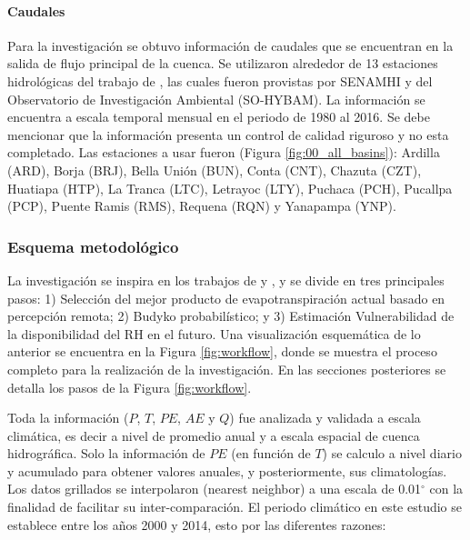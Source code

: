 \documentclass[12pt]{article}
\begin{document}
\paragraph{Caudales}\mbox{}

Para la investigación se obtuvo información de caudales que se encuentran en la salida de flujo principal de la cuenca. Se utilizaron alrededor de 13 estaciones hidrológicas del trabajo de \citet{Aybar2019}, las cuales fueron provistas por SENAMHI y del Observatorio de Investigación Ambiental (SO-HYBAM). La información se encuentra a escala temporal mensual en el periodo de 1980 al 2016. Se debe mencionar que la información presenta un control de calidad riguroso y no esta completado. Las estaciones a usar fueron (Figura \ref{fig:00_all_basins}): Ardilla (ARD), Borja (BRJ), Bella Unión (BUN), Conta (CNT), Chazuta (CZT), Huatiapa (HTP), La Tranca (LTC), Letrayoc (LTY), Puchaca (PCH), Pucallpa (PCP), Puente Ramis (RMS), Requena (RQN) y Yanapampa (YNP).

\clearpage

\clearpage

\clearpage

\subsubsection{Esquema metodológico}

La investigación se inspira en los trabajos de \citet{Singh2015} y \citet{Weerasinghe2019discuss}, y se divide en tres principales pasos: 1) Selección del mejor producto de evapotranspiración actual basado en percepción remota; 2) Budyko probabilístico; y 3) Estimación Vulnerabilidad de la disponibilidad del RH en el futuro. Una visualización esquemática de lo anterior se encuentra en la Figura \ref{fig:workflow}, donde se muestra el proceso completo para la realización de la investigación. En las secciones posteriores se detalla los pasos de la Figura \ref{fig:workflow}.



Toda la información ($P$, $T$, $PE$, $AE$ y $Q$) fue analizada y validada a escala climática, es decir a nivel de promedio anual y a escala espacial de cuenca hidrográfica. Solo la información de $PE$ (en función de $T$) se calculo a nivel diario y acumulado para obtener valores anuales, y posteriormente, sus climatologías. Los datos grillados se interpolaron (nearest neighbor) a una escala de 0.01$^{\circ}$ con la finalidad de facilitar su inter-comparación. El periodo climático en este estudio se establece entre los años 2000 y 2014, esto por las diferentes razones:
\end{document}
